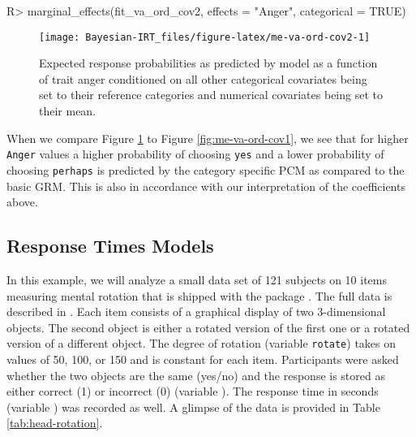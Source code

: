 \documentclass[jss]{jss}
\begin{document}
\begin{CodeChunk}

\begin{CodeInput}
R> marginal_effects(fit_va_ord_cov2, effects = "Anger", categorical = TRUE)
\end{CodeInput}
\begin{figure}

{\centering \texttt{[image: Bayesian-IRT\_files/figure-latex/me-va-ord-cov2-1]} 

}

\caption[Expected response probabilities as predicted by model  as a function of trait anger conditioned on all other categorical covariates being set to their reference categories and numerical covariates being set to their mean]{Expected response probabilities as predicted by model  as a function of trait anger conditioned on all other categorical covariates being set to their reference categories and numerical covariates being set to their mean.}\label{fig:me-va-ord-cov2}
\end{figure}
\end{CodeChunk}

When we compare Figure \ref{fig:me-va-ord-cov2} to Figure
\ref{fig:me-va-ord-cov1}, we see that for higher \texttt{Anger} values a
higher probability of choosing \texttt{yes} and a lower probability of
choosing \texttt{perhaps} is predicted by the category specific PCM as
compared to the basic GRM. This is also in accordance with our
interpretation of the coefficients above.

\hypertarget{response-times}{%
\subsection{Response Times Models}\label{response-times}}

In this example, we will analyze a small data set of 121 subjects on 10
items measuring mental rotation that is shipped with the 
package \citetext{\citealp{diffIRT}; \citealp[see
also][]{vandermaas2011}}. The full data is described in
\citet{borst2011}. Each item consists of a graphical display of two
3-dimensional objects. The second object is either a rotated version of
the first one or a rotated version of a different object. The degree of
rotation (variable \texttt{rotate}) takes on values of 50, 100, or 150
and is constant for each item. Participants were asked whether the two
objects are the same (yes/no) and the response is stored as either
correct (1) or incorrect (0) (variable ). The response time
in seconds (variable ) was recorded as well. A glimpse of the
data is provided in Table \ref{tab:head-rotation}.
\end{document}
